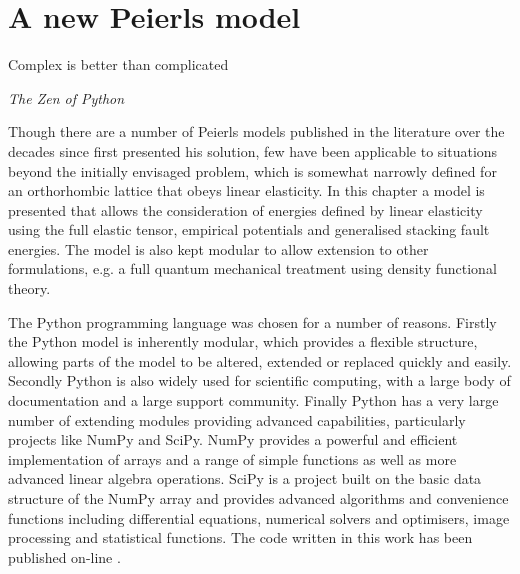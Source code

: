 
\chapter{A new Peierls model}
\label{chap:peierls_model}
\graphicspath{{peierls_model/Figs/}}

\epigraph{Complex is better than complicated}{\emph{The Zen of Python}}


Though there are a number \cite{Nabarro1947,Huntington1955, puls1976, Vitek1992,  Bulatov1997, Lubarda2007, Clegg2006,Gouriet2015} of Peierls models published in the literature over the decades since \citet{Peierls1940} first presented his solution, few have been applicable to situations beyond the initially envisaged problem, which is somewhat narrowly defined for an orthorhombic lattice that obeys linear elasticity. In this chapter a model is presented that allows  the consideration of energies defined by linear elasticity using the full elastic tensor, empirical potentials and generalised stacking fault energies. The model is also kept modular to allow extension to other formulations, e.g. a full quantum mechanical treatment using density functional theory.

The Python programming language was chosen for a number of reasons. Firstly the Python model is inherently modular, which provides a flexible structure, allowing parts of the model to be altered, extended or replaced quickly and easily. Secondly Python is also widely used for scientific computing, with a large body of documentation and a large support community. Finally Python has a very large number of extending modules providing advanced capabilities, particularly projects like NumPy and SciPy. NumPy provides a powerful and efficient implementation of arrays and a range of simple functions as well as more advanced linear algebra operations. SciPy is a project built on the basic data structure of the NumPy array and provides advanced algorithms and convenience functions including differential equations, numerical solvers and optimisers, image processing and statistical functions. The code written in this work has been published on-line \cite{code}. 

